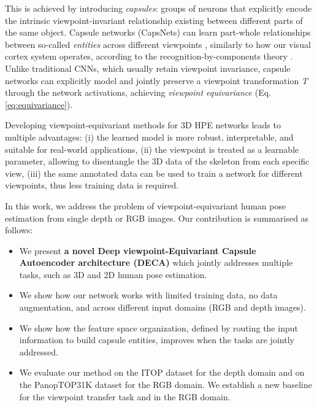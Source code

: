 \documentclass[10pt,twocolumn,letterpaper]{article}
\begin{document}
This is achieved by introducing \textit{capsules}: groups of neurons that explicitly encode the intrinsic viewpoint-invariant relationship existing between different parts of the same object. 
Capsule networks (CapsNets) can learn part-whole relationships between so-called \textit{entities} across different viewpoints \cite{hinton2011transforming, sabour2017dynamic, hinton2018matrix}, similarly to how our visual cortex system operates, according to the recognition-by-components theory \cite{biederman1987recognition}.
Unlike traditional CNNs, which usually retain viewpoint invariance, capsule networks can explicitly model and jointly preserve a viewpoint transformation \textit{T} through the network activations, achieving \textit{viewpoint equivariance} (Eq. \ref{eq:equivariance}). 

Developing viewpoint-equivariant methods for 3D HPE networks leads to multiple advantages: (i) the learned model is more robust, interpretable, and suitable for real-world applications, (ii) the viewpoint is treated as a learnable parameter, allowing to disentangle the 3D data of the skeleton from each specific view, (iii) the same annotated data can be used to train a network for different viewpoints, thus less training data is required.

In this work, we address the problem of viewpoint-equivariant human pose estimation from single depth or RGB images. Our contribution is summarised as follows:
\begin{itemize}
    \item We present \textbf{a novel Deep viewpoint-Equivariant Capsule Autoencoder architecture (DECA)} which jointly addresses multiple tasks, such as 3D and 2D human pose estimation.

    \item We show how our network works with limited training data, no data augmentation, and across different input domains (RGB and depth images).

    \item We show how the feature space organization, defined by routing the input information to build capsule entities, improves when the tasks are jointly addressed.

    \item We evaluate our method on the ITOP \cite{haque2016towards} dataset for the depth domain and on the PanopTOP31K \cite{garau2021panoptop} dataset for the RGB domain. We establish a new baseline for the viewpoint transfer task and in the RGB domain.
\end{itemize}
\end{document}
